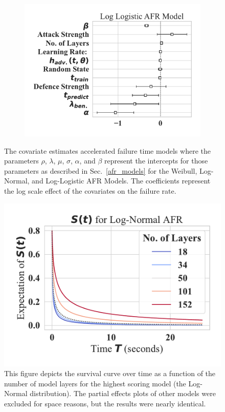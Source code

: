 \begin{figure}
\begin{subfigure}{0.32\textwidth}
        \includegraphics[width=\textwidth]{cifar/log_logistic_aft.pdf}
    \end{subfigure}
    
    \caption{The covariate estimates accelerated failure time models where the parameters $\rho$, $\lambda$, $\mu$, $\sigma$, $\alpha$, and $\beta$ represent the intercepts for those parameters as described in Sec.~\ref{afr_models} for the Weibull, Log-Normal, and Log-Logistic AFR Models. The coefficients represent the log scale effect of the covariates on the failure rate.}
    \label{fig:afr_models}
\end{figure}

\begin{figure}
    \centering\includegraphics[width=.5\textwidth]{cifar/log_normal_partial_effects.pdf}
   \caption{This figure depicts the survival curve over time as a function of the number of model layers for the highest scoring model (the Log-Normal distribution). The partial effects plots of other models were excluded for space reasons, but the results were nearly identical.}
    \label{fig:layers}
\end{figure}

% 


